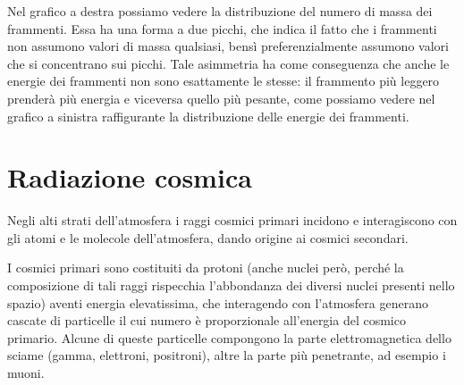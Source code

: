 \vspace{0.3cm}Nel grafico a destra possiamo vedere la distribuzione del numero di massa dei frammenti. Essa ha una forma a due picchi, che indica il fatto che i frammenti non assumono valori di massa qualsiasi, bensì preferenzialmente assumono valori che si concentrano sui picchi. Tale asimmetria ha come conseguenza che anche le energie dei frammenti non sono esattamente le stesse: il frammento più leggero prenderà più energia e viceversa quello più pesante, come possiamo vedere nel grafico a sinistra raffigurante la distribuzione delle energie dei frammenti.

\section{Radiazione cosmica}

Negli alti strati dell'atmosfera i raggi cosmici primari incidono e interagiscono con gli atomi e le molecole dell'atmosfera, dando origine ai cosmici secondari.

I cosmici primari sono costituiti da protoni (anche nuclei però, perché la composizione di tali raggi rispecchia l'abbondanza dei diversi nuclei presenti nello spazio) aventi energia elevatissima, che interagendo con l'atmosfera generano cascate di particelle il cui numero è proporzionale all'energia del cosmico primario. Alcune di queste particelle compongono la parte elettromagnetica dello sciame (gamma, elettroni, positroni), altre la parte più penetrante, ad esempio i muoni.

